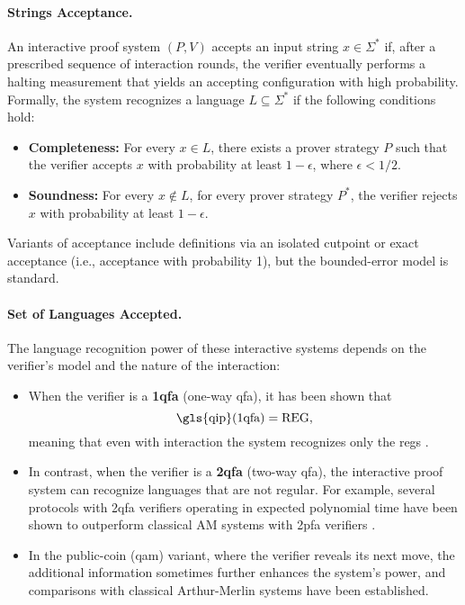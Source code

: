 \paragraph{Strings Acceptance.}
An interactive proof system $(P,V)$ accepts an input string $x\in\Sigma^*$ if, after a prescribed sequence of interaction rounds, the verifier eventually performs a halting measurement that yields an accepting configuration with high probability. Formally, the system recognizes a language $L\subseteq\Sigma^*$ if the following conditions hold:
\begin{itemize}
  \item \textbf{Completeness:} For every $x\in L$, there exists a prover strategy $P$ such that the verifier accepts $x$ with probability at least $1-\epsilon$, where $\epsilon<1/2$.
  \item \textbf{Soundness:} For every $x\notin L$, for every prover strategy $P^*$, the verifier rejects $x$ with probability at least $1-\epsilon$.
\end{itemize}
Variants of acceptance include definitions via an isolated cutpoint or exact acceptance (i.e., acceptance with probability 1), but the bounded-error model is standard.

\paragraph{Set of Languages Accepted.}
The language recognition power of these interactive systems depends on the verifier's model and the nature of the interaction:
\begin{itemize}
  \item When the verifier is a \textbf{1qfa} (one-way qfa), it has been shown that
  \[
  \text{\gls{qip}(1qfa)} = \text{REG},
  \]
  meaning that even with interaction the system recognizes only the \glspl{reg} \cite{nishimura2009application}.
  \item In contrast, when the verifier is a \textbf{2qfa} (two-way qfa), the interactive proof system can recognize languages that are not regular. For example, several protocols with 2qfa verifiers operating in expected polynomial time have been shown to outperform classical AM systems with 2pfa verifiers \cite{zheng2015power, nishimura2015interactive}.
  \item In the public-coin (\gls{qam}) variant, where the verifier reveals its next move, the additional information sometimes further enhances the system's power, and comparisons with classical Arthur-Merlin systems have been established.
\end{itemize}

